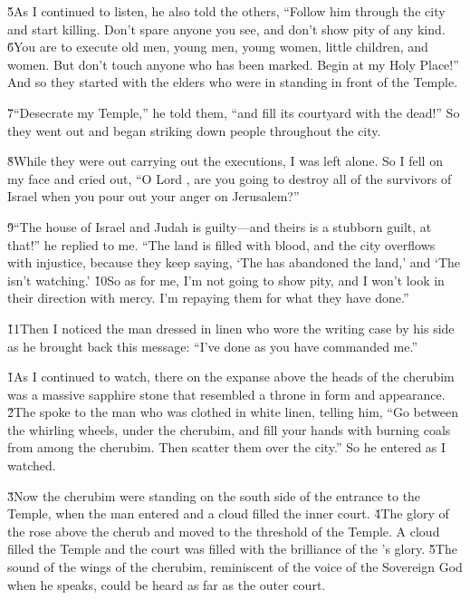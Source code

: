 \v{5}As I continued to listen, he also told the others, ``Follow him through the city and start killing. Don't spare anyone you see, and don't show pity of any kind. \v{6}You are to execute old men, young men, young women, little children, and women. But don't touch anyone who has been marked. Begin at my Holy Place!'' And so they started with the elders who were in standing in front of the Temple.

\v{7}``Desecrate my Temple,'' he told them, ``and fill its courtyard with the dead!'' So they went out and began striking down people throughout the city.

\v{8}While they were out carrying out the executions, I was left alone. So I fell on my face and cried out, ``O Lord , are you going to destroy all of the survivors of Israel when you pour out your anger on Jerusalem?''

\v{9}``The house of Israel and Judah is guilty---and theirs is a stubborn guilt, at that!'' he replied to me. ``The land is filled with blood, and the city overflows with injustice, because they keep saying, `The  has abandoned the land,' and `The  isn't watching.' \v{10}So as for me, I'm not going to show pity, and I won't look in their direction with mercy. I'm repaying them for what they have done.''

\v{11}Then I noticed the man dressed in linen who wore the writing case by his side as he brought back this message: ``I've done as you have commanded me.''

\v{1}As I continued to watch, there on the expanse above the heads of the cherubim was a massive sapphire stone that resembled a throne in form and appearance. \v{2}The  spoke to the man who was clothed in white linen, telling him, ``Go between the whirling wheels, under the cherubim, and fill your hands with burning coals from among the cherubim. Then scatter them over the city.'' So he entered as I watched.

\v{3}Now the cherubim were standing on the south side of the entrance to the Temple, when the man entered and a cloud filled the inner court. \v{4}The glory of the  rose above the cherub and moved to the threshold of the Temple. A cloud filled the Temple and the court was filled with the brilliance of the 's glory. \v{5}The sound of the wings of the cherubim, reminiscent of the voice of the Sovereign God when he speaks, could be heard as far as the outer court.

